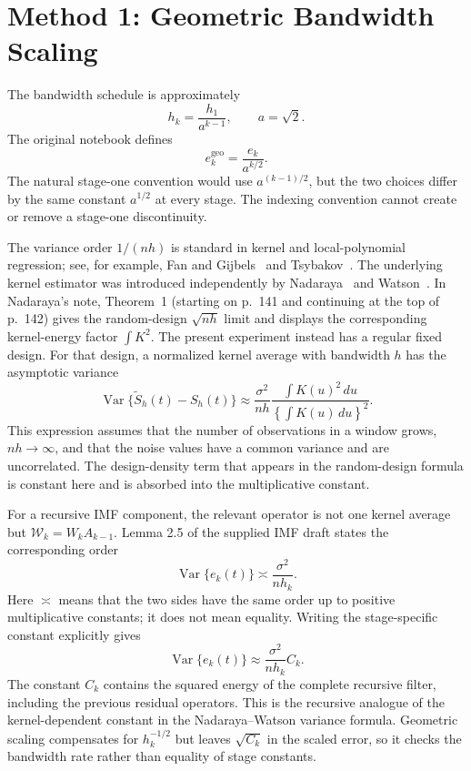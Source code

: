 \documentclass[11pt]{article}
\newcommand{\Var}{\operatorname{Var}}
\newcommand{\Wcal}{\mathcal{W}}
\begin{document}
\section{Method 1: Geometric Bandwidth Scaling}

The bandwidth schedule is approximately
\[
h_k=\frac{h_1}{a^{k-1}},
\qquad a=\sqrt{2}.
\]
The original notebook defines
\[
e_k^{\mathrm{geo}}=\frac{e_k}{a^{k/2}}.
\]
The natural stage-one convention would use $a^{(k-1)/2}$, but the two choices
differ by the same constant $a^{1/2}$ at every stage. The indexing convention
cannot create or remove a stage-one discontinuity.

The variance order $1/(nh)$ is standard in kernel and local-polynomial
regression; see, for example, Fan and Gijbels~\cite{fan-gijbels1996} and
Tsybakov~\cite{tsybakov2009}. The underlying kernel estimator was introduced
independently by Nadaraya~\cite{nadaraya1964} and Watson~\cite{watson1964}.
In Nadaraya's note, Theorem~1 (starting on p.~141 and continuing at the top of
p.~142) gives the random-design $\sqrt{nh}$ limit and displays the corresponding
kernel-energy factor $\int K^2$.  The present experiment instead has a regular
fixed design.  For that design, a normalized kernel average with bandwidth $h$
has the asymptotic variance
\[
\Var\{\widetilde S_h(t)-S_h(t)\}
\approx
\frac{\sigma^2}{nh}
\frac{\int K(u)^2\,du}{\left\{\int K(u)\,du\right\}^2}.
\]
This expression assumes that the number of observations in a window grows,
$nh\to\infty$, and that the noise values have a common variance and are
uncorrelated. The design-density term that appears in the random-design formula
is constant here and is absorbed into the multiplicative constant.

For a recursive IMF component, the relevant operator is not one kernel average
but $\Wcal_k=W_kA_{k-1}$. Lemma 2.5 of the supplied IMF draft
\cite{spokoiny2026} states the corresponding order
\[
\Var\{e_k(t)\}
\asymp \frac{\sigma^2}{nh_k}.
\]
Here $\asymp$ means that the two sides have the same order up to positive
multiplicative constants; it does not mean equality. Writing the stage-specific
constant explicitly gives
\[
\Var\{e_k(t)\}
\approx \frac{\sigma^2}{nh_k}C_k.
\]
The constant $C_k$ contains the squared energy of the complete recursive filter,
including the previous residual operators. This is the recursive analogue of
the kernel-dependent constant in the Nadaraya--Watson variance formula.
Geometric scaling compensates for $h_k^{-1/2}$ but leaves $\sqrt{C_k}$ in the
scaled error, so it checks the bandwidth rate rather than equality of stage
constants.
\end{document}
